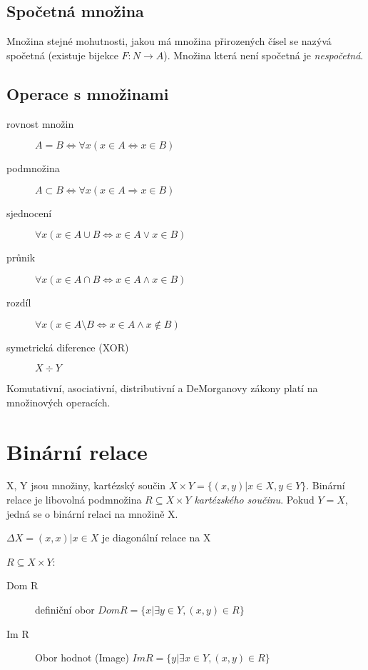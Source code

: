 \documentclass[a4paper, 11pt]{report}
\begin{document}
\subsection{Spočetná množina}
Množina stejné mohutnosti, jakou má množina přirozených čísel se nazývá spočetná (existuje bijekce $F: N \to A$). Množina která není spočetná je \emph{nespočetná}.

\subsection{Operace s množinami}

\begin{description}
	\item[rovnost množin] $A = B \iff \forall x (x \in A \iff x \in B)$
	\item[podmnožina] $ A \subset B \iff \forall x (x \in A \Rightarrow x \in B)$
	\item[sjednocení] $ \forall x (x \in A \cup B \iff x \in A \lor x \in B)$
	\item[průnik] $ \forall x ( x \in A \cap B \iff x \in A \land x \in B)$
	\item[rozdíl] $ \forall x ( x \in A \setminus B \iff x \in A \land x \notin B)$
	\item[symetrická diference (XOR)] $X \div Y$ 
\end{description}

Komutativní, asociativní, distributivní a DeMorganovy zákony platí na množinových operacích.

\section{Binární relace}

X, Y jsou množiny, kartézský součin $X \times Y = \{(x,y) | x \in X, y \in Y\}$. Binární relace je libovolná podmnožina $R \subseteq X \times Y$ \emph{kartézského součinu}. Pokud $Y = X$, jedná se o binární relaci na množině X.

$\Delta{}X = {(x,x) | x \in X}$ je diagonální relace na X

$R \subseteq X \times Y$:
\begin{description}
	\item[Dom R] definiční obor $Dom R = \{x | \exists y  \in Y, (x,y) \in R\}$
	\item[Im R] Obor hodnot (Image) $Im R = \{y | \exists x  \in Y, (x,y) \in R\}$
\end{description}
\end{document}

